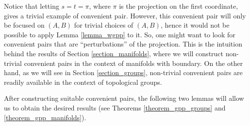 \documentclass{amsart}
\theoremstyle{plain}
\theoremstyle{definition}
\begin{document}
Notice that letting $s=t=\pi$, where $\pi$ is the projection on the first coordinate, gives a trivial example of convenient pair. However, this convenient pair will only be focused on $(A,B)$ for trivial choices of $(A,B)$, hence it would not be possible to apply Lemma \ref{lemma_wgpp} to it. So, one might want to look for convenient pairs that are ``perturbations'' of the projection. This is the intuition behind the results of Section \ref{section_manifolds}, where we will construct non-trivial convenient pairs in the context of manifolds with boundary. On the other hand, as we will see in Section \ref{section_groups}, non-trivial convenient pairs are readily available in the context of topological groups.

After constructing suitable convenient pairs, the following two lemmas will allow us to obtain the desired results (see Theorems \ref{theorem_gpp_groups} and \ref{theorem_gpp_manifolds}).
\end{document}
